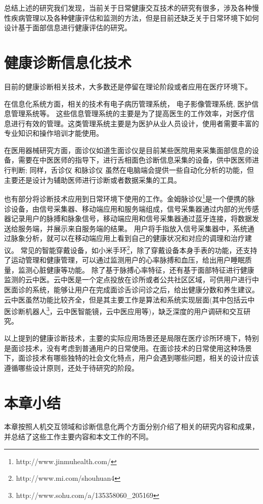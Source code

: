 总结上述的研究我们发现，当前关于日常健康交互技术的研究有很多，涉及各种慢性疾病管理以及各种健康评估和监测的方法，但是目前还缺乏关于日常环境下如何设计基于面部信息进行健康评估的研究。

\section{健康诊断信息化技术}

目前的健康诊断相关技术，大多数还是停留在理论阶段或者应用在医疗环境下。

在信息化系统方面，相关的技术有电子病历管理系统\cite{高春芳2013电子病历系统应用现状及前景展望}， 电子影像管理系统\cite{张安平2018医院信息管理系统的电子病历和医学影像系统分析}, 医护信息管理系统\cite{虞正红2018医护合作静脉血栓栓塞管理信息化平台的设计与应用}等。
这些信息管理系统的主要是为了提高医生的工作效率，对医疗信息进行有效的管理。这类管理系统主要是为医护从业人员设计，使用者需要丰富的专业知识和操作培训才能使用。

在医用器械研究方面，面诊仪如道生面诊仪\cite{邸丹2016手持式舌象仪的研制}是目前某些医院用来采集面部信息的设备，需要在中医医师的指导下，进行舌相面色诊断信息采集的设备，供中医医师进行判断;
 同样，舌诊仪\cite{李丹溪2017舌诊仪的发展及其在舌诊客观化研究中的应用现状} 和脉诊仪 \cite{牛婷婷2017脉诊仪}虽然在电脑端会提供一些自动化分析的功能，但主要还是设计为辅助医师进行诊断或者数据采集的工具。
 
 也有部分将诊断技术应用到日常环境下使用的工作。金姆脉诊仪\footnote{http://www.jinmuhealth.com/}是一个便携的脉诊设备，由信号采集器、移动端应用和服务端组成，信号采集器通过内部的光传感器记录用户的脉搏和脉象信号，移动端应用和信号采集器通过蓝牙连接，将数据发送给服务端，并展示来自服务端的结果。
 用户将手指放入信号采集器中，系统通过脉象分析，就可以在移动端应用上看到自己的健康状况和对应的调理和治疗建议。
 常见的智能穿戴设备，如小米手环\footnote{http://www.mi.com/shouhuan4}，除了穿戴设备本身手表的功能，还支持了运动管理和健康管理，可以通过监测用户的心率脉搏和血压，给出用户睡眠质量，监测心脏健康等功能。
除了基于脉搏心率特征，还有基于面部特征进行健康监测的云中医\cite{Zhang2018Study}。云中医是一个定点投放在诊所或者公共社区区域，可供用户进行中医面诊的系统，能够让用户在完成面诊舌诊问诊之后，给出健康分数和养生建议。
 云中医虽然功能比较齐全，但是其主要工作是算法和系统实现层面(其中包括云中医诊断机器人\footnote{http://www.sohu.com/a/135358060_205169}，云中医智能镜\cite{李雪2016}，云中医应用\cite{钱鹏基于云中医的健康监测方法及系统}等)，缺乏深度的用户调研和交互研究。

以上提到的健康诊断技术，主要的实际应用场景还是局限在医疗诊所环境下，特别是面诊技术，没有考虑到普通用户的日常使用。在面诊技术的日常使用这种场景下，面诊技术有哪些独特的社会文化特点，用户会遇到哪些问题，相关的设计应该遵循哪些设计原则，还处于待研究的阶段。

\section{本章小结}
本章按照人机交互领域和诊断信息化两个方面分别介绍了相关的研究内容和成果，并总结了这些工作主要内容和本文工作的不同。